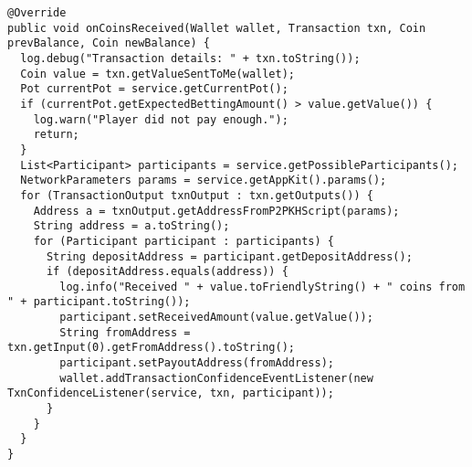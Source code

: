 \begin{lstlisting}[basicstyle=\small]
@Override
public void onCoinsReceived(Wallet wallet, Transaction txn, Coin prevBalance, Coin newBalance) {
  log.debug("Transaction details: " + txn.toString());
  Coin value = txn.getValueSentToMe(wallet);
  Pot currentPot = service.getCurrentPot();
  if (currentPot.getExpectedBettingAmount() > value.getValue()) {
    log.warn("Player did not pay enough.");
    return;
  }
  List<Participant> participants = service.getPossibleParticipants();
  NetworkParameters params = service.getAppKit().params();
  for (TransactionOutput txnOutput : txn.getOutputs()) {
    Address a = txnOutput.getAddressFromP2PKHScript(params);
    String address = a.toString();
    for (Participant participant : participants) {
      String depositAddress = participant.getDepositAddress();
      if (depositAddress.equals(address)) {
        log.info("Received " + value.toFriendlyString() + " coins from " + participant.toString());
        participant.setReceivedAmount(value.getValue());
        String fromAddress = txn.getInput(0).getFromAddress().toString();
        participant.setPayoutAddress(fromAddress);
        wallet.addTransactionConfidenceEventListener(new TxnConfidenceListener(service, txn, participant));
      }
    }
  }
}
\end{lstlisting}

